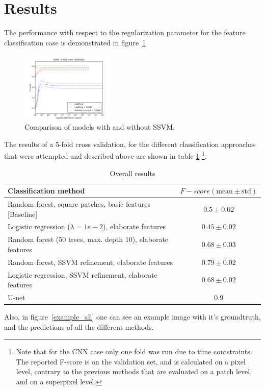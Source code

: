 \documentclass[10pt,conference,compsocconf]{IEEEtran}
\begin{document}
	\section{Results}
	The performance with respect to the regularization parameter for the feature classification case is demonstrated in figure~\ref{fig:reg_ssvm}
		\begin{figure}[!h]
			\centering
			\includegraphics[width=0.4\textwidth]{cross_val_ssvm.png}
			\caption{Comparison of models with and without SSVM.}
			\label{fig:reg_ssvm}
		\end{figure}
The results of a 5-fold cross validation, for the different classification
  approaches that were attempted and described above are shown in table \ref{table:results}  \footnote{Note that for the CNN case only one fold was run due to time contstraints. The reported F-score is on the validation set, and is calculated on a pixel level, contrary to the previous methods that are evaluated on a patch level, and on a superpixel level.}.
		\begin{table}[h]
			\begin{tabular}{p{} c}		
				\textbf{Classification method} &  \textbf{$F-score (\text{mean}\pm \text{std})$}\\
				\hline \hline
				Random forest, square patches, basic features [Baseline] & $0.5 \pm 0.02$ \\ \hline
				Logistic regression ($\lambda = 1e-2$), elaborate features& $0.45 \pm 0.02$ \\ \hline
				Random forest (50 trees, max. depth 10), elaborate features& $0.68 \pm 0.03$ \\ \hline
				Random forest, SSVM refinement, elaborate features & $0.79 \pm 0.02$ \\ \hline
				Logistic regression, SSVM refinement, elaborate features& $0.68 \pm 0.02$ \\ \hline
				U-net & $0.9$ \\
				\hline
			\end{tabular}
			\caption{\label{table:results}Overall results}
		\end{table}
	Also, in figure~\ref{example_all} one can see an example image with it's groundtruth, and the predictions of all the different methods.
\end{document}
